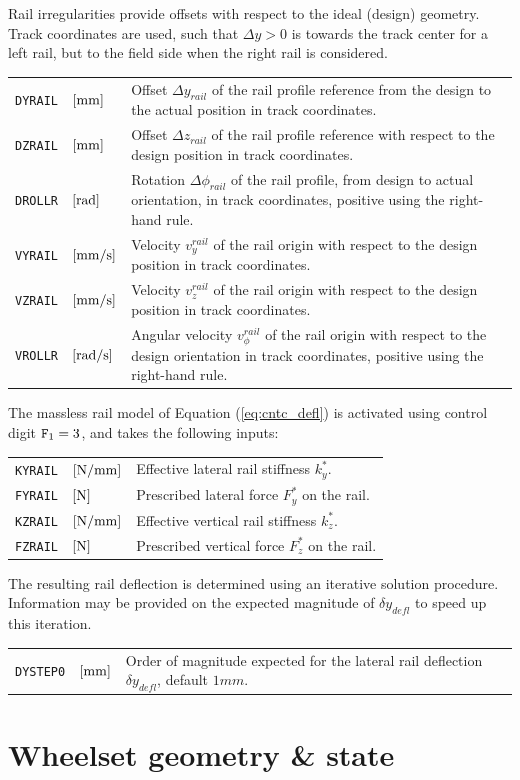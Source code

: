 \documentclass[12pt]{report}
\newenvironment{inputvars}{\vspace{0.4\baselineskip}%

\begin{tabular}{>{\raggedright}p{22mm}p{19mm}p{113mm}}}{
\end{tabular}

}
\newcommand{\inpvar}[3]{{\small\tt #1} & $#2$ & #3 \\[1ex]}
\begin{document}
Rail irregularities provide offsets with respect to the ideal (design)
geometry. Track coordinates are used, such that $\Delta y>0$ is towards
the track center for a left rail, but to the field side when the right rail
is considered.
\begin{inputvars}
\inpvar{DYRAIL}{\bunit{mm}}{Offset $\Delta y_{rail}$ of the rail profile
        reference from the design to the actual position in track coordinates.}
\inpvar{DZRAIL}{\bunit{mm}}{Offset $\Delta z_{rail}$ of the rail profile
        reference with respect to the design position in track coordinates.}
\inpvar{DROLLR}{\bunit{rad}}{Rotation $\Delta \phi_{rail}$ of the rail profile,
        from design to actual orientation, in track coordinates,
        positive using the right-hand rule.}
\inpvar{VYRAIL}{\bunit{mm/s}}{Velocity $v_y^{rail}$ of the rail origin with
        respect to the design position in track coordinates.}
\inpvar{VZRAIL}{\bunit{mm/s}}{Velocity $v_z^{rail}$ of the rail origin with
        respect to the design position in track coordinates.}
\inpvar{VROLLR}{\bunit{rad/s}}{Angular velocity $v_\phi^{rail}$ of the rail
        origin with respect to the design orientation in track coordinates,
        positive using the right-hand rule.}
\end{inputvars}

The massless rail model of Equation (\ref{eq:cntc_defl}) is activated using
control digit ${\tt F}_1=3$, and takes the following inputs:
\begin{inputvars}
\inpvar{KYRAIL}{\bunit{N/mm}}{Effective lateral rail stiffness $k^*_y$.}
\inpvar{FYRAIL}{\bunit{N}}{Prescribed lateral force $F_y^*$ on the rail.}
\inpvar{KZRAIL}{\bunit{N/mm}}{Effective vertical rail stiffness $k^*_z$.}
\inpvar{FZRAIL}{\bunit{N}}{Prescribed vertical force $F_z^*$ on the rail.}
\end{inputvars}
The resulting rail deflection is determined using an iterative solution
procedure. Information may be provided on the expected magnitude of $\delta
y_{defl}$ to speed up this iteration.
\begin{inputvars}
\inpvar{DYSTEP0}{\bunit{mm}}{Order of magnitude expected for the lateral
                rail deflection $\delta y_{defl}$, default $1\unit{mm}$.}
\end{inputvars}
 
\section{Wheelset geometry \& state}
\label{sec:wheelset_geom}
\end{document}
